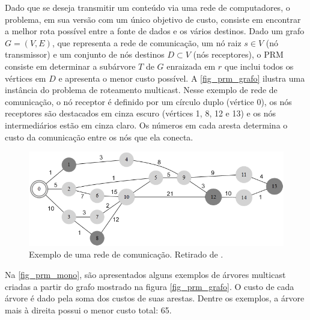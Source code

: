 Dado que se deseja transmitir um conteúdo via uma rede de computadores, o problema, em sua versão com um único objetivo de custo, consiste em encontrar a melhor rota possível entre a fonte de dados e os vários destinos. Dado um grafo $G=(V,E)$, que representa a rede de comunicação, um nó raiz $s \in V$ (nó transmissor) e um conjunto de nós destinos $D \subset V$ (nós receptores), o PRM consiste em determinar a subárvore $T$ de $G$ enraizada em $r$ que inclui todos os vértices em $D$ e apresenta o menor custo possível. A \autoref{fig_prm_grafo} ilustra uma instância do problema de roteamento multicast. Nesse exemplo de rede de comunicação, o nó receptor é definido por um círculo duplo (vértice 0), os nós receptores são destacados em cinza escuro (vértices 1, 8, 12 e 13) e os nós intermediários estão em cinza claro. Os números em cada aresta determina o custo da comunicação entre os nós que ela conecta.

\begin{figure}[!htbp]
	\centering
	\includegraphics[width=1\textwidth]{cap_problemas/figs/prm_grafo}
	\caption{\label{fig_prm_grafo}Exemplo de uma rede de comunicação. Retirado de \cite{BuenoThesis}.}
\end{figure}

Na \autoref{fig_prm_mono}, são apresentados alguns exemplos de árvores multicast criadas a partir do grafo mostrado na figura \autoref{fig_prm_grafo}. O custo de cada árvore é dado pela soma dos custos de suas arestas. Dentre os exemplos, a árvore mais à direita possui o menor custo total: 65.

